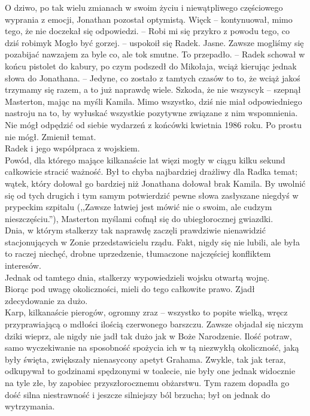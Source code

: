 \documentclass[../MAIN.tex]{subfiles}
\begin{document}
O dziwo, po tak wielu zmianach w swoim życiu i niewątpliwego częściowego wyprania z emocji, Jonathan pozostał optymistą.
\sx Więc\3k -- kontynuował, mimo tego, że nie doczekał się odpowiedzi. -- Robi mi się przykro z powodu tego, co dziś robimy\3k
\xx Mogło być gorzej. -- uspokoił się Radek.
\xx Jasne. Zawsze mogliśmy się pozabijać nawzajem za byle co, ale to\3k smutne.
\xx To przepadło. -- Radek schował w końcu pistolet do kabury, po czym podszedł do Mikołaja, wciąż kierując jednak słowa do Jonathana. -- Jedyne, co zostało z tamtych czasów to to, że wciąż jakoś trzymamy się razem, a to już naprawdę wiele.
\xx Szkoda, że nie wszyscy\3k -- szepnął Masterton, mając na myśli Kamila.
\qd
Mimo wszystko, dziś nie miał odpowiedniego nastroju na to, by wyłuskać wszystkie pozytywne związane z nim wspomnienia. Nie mógł odpędzić od siebie wydarzeń z końcówki kwietnia 1986 roku. Po prostu nie mógł. Zmienił temat.\\
Radek i jego współpraca z wojskiem.\\
Powód, dla którego mające kilkanaście lat więzi mogły w ciągu kilku sekund całkowicie stracić ważność. Był to chyba najbardziej drażliwy dla Radka temat; wątek, który dołował go bardziej niż Jonathana dołował brak Kamila. By uwolnić się od tych drugich i tym samym potwierdzić pewne słowa zasłyszane niegdyś w prypeckim szpitalu (,,Zawsze łatwiej jest mówić nie o swoim, ale cudzym nieszczęściu.''), Masterton myślami cofnął się do ubiegłorocznej gwiazdki.\\
Dnia, w którym stalkerzy tak naprawdę zaczęli prawdziwie nienawidzić stacjonujących w Zonie przedstawicielu rządu. Fakt, nigdy się nie lubili, ale była to raczej niechęć, drobne uprzedzenie, tłumaczone najczęściej konfliktem interesów.\\
Jednak od tamtego dnia, stalkerzy wypowiedzieli wojsku otwartą wojnę.\\
Biorąc pod uwagę okoliczności, mieli do tego całkowite prawo.
% 
% 
% 
Zjadł zdecydowanie za dużo.\\
Karp, kilkanaście pierogów, ogromny zraz -- wszystko to popite wielką, wręcz przyprawiającą o mdłości ilością czerwonego barszczu. Zawsze objadał się niczym dziki wieprz, ale nigdy nie jadł tak dużo jak w Boże Narodzenie. Ilość potraw, samo wyczekiwanie na sposobność spożycia ich w tą niezwykłą okoliczność, jaką były święta, zwiększały nienasycony apetyt Grahama. Zwykle, tak jak teraz, odkupywał to godzinami spędzonymi w toalecie, nie były one jednak widocznie na tyle złe, by zapobiec przyszłorocznemu obżarstwu. Tym razem dopadła go dość silna niestrawność i jeszcze silniejszy ból brzucha; był on jednak do wytrzymania.\\
\end{document}
